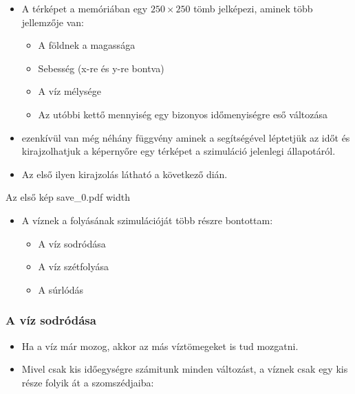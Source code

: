 \documentclass{beamer}
\begin{document}
	\begin{frame}
		\begin{itemize}
			\item A térképet a memóriában egy $250 \times 250$ tömb jelképezi, aminek több jellemzője van:

			
			\begin{itemize}
				\item A földnek a magassága
			
				\item Sebesség (x-re és y-re bontva)
			
				\item A víz mélysége
			
				\item Az utóbbi kettő mennyiség egy bizonyos időmenyiségre eső változása
			
			\end{itemize}
			\item ezenkívül van még néhány függvény aminek a segítségével léptetjük az időt és kirajzolhatjuk a képernyőre egy térképet a szimuláció jelenlegi állapotáról.
			
			\item Az első ilyen kirajzolás látható a következő dián.
		\end{itemize}
	\end{frame}
	\begin{frame}
		Az első kép
		\XeTeXpdffile save_0.pdf width \textwidth
	\end{frame}
	\begin{frame}
		\begin{itemize}
			\item A víznek a folyásának szimulációját több részre bontottam:
			
			\begin{itemize}
				\item A víz sodródása
				
				\item A víz szétfolyása
				
				\item A súrlódás
			\end{itemize}
		\end{itemize}
	\end{frame}
	\begin{frame}
		\frametitle{A víz sodródása}
		\begin{itemize}
			\item Ha a víz már mozog, akkor az más víztömegeket is tud mozgatni.
			
			\item Mivel csak kis időegységre számitunk minden változást, a víznek csak egy kis része folyik át a szomszédjaiba:
		\end{itemize}
	\end{frame}
\end{document}

